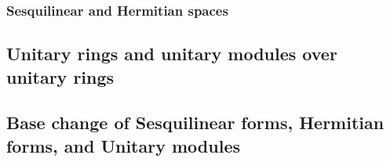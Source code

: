 



\subsubsection{Sesquilinear and Hermitian spaces}







\subsection{Unitary rings and unitary modules over unitary rings}







\begin{definition}
\end{definition}


\subsection{Base change of Sesquilinear forms, Hermitian forms, and Unitary modules}

